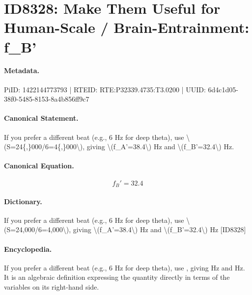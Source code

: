 \section*{ID8328: Make Them Useful for Human-Scale / Brain-Entrainment: f\_B'}
\paragraph{Metadata.}
PiID: 1422144773793 | RTEID: RTE:P32339.4735:T3.0200 | UUID: 6d4c1d05-38f0-5485-8153-8a4b856ff9c7

\paragraph{Canonical Statement.}
If you prefer a different beat (e.g., 6 Hz for deep theta), use \textbackslash{}(S=24\{,\}000/6=4\{,\}000\textbackslash{}), giving \textbackslash{}(f\_A'=38.4\textbackslash{}) Hz and \textbackslash{}(f\_B'=32.4\textbackslash{}) Hz.

\paragraph{Canonical Equation.}
\[
f_B'=32.4
\]

\paragraph{Dictionary.}
If you prefer a different beat (e.g., 6 Hz for deep theta), use \textbackslash{}(S=24,000/6=4,000\textbackslash{}), giving \textbackslash{}(f\_A'=38.4\textbackslash{}) Hz and \textbackslash{}(f\_B'=32.4\textbackslash{}) Hz [ID8328]

\paragraph{Encyclopedia.}
If you prefer a different beat (e.g., 6 Hz for deep theta), use , giving Hz and Hz. It is an algebraic definition expressing the quantity directly in terms of the variables on its right-hand side.
